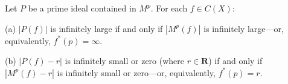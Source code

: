 Let $P$ be a prime ideal contained in $M^p$. For each $f \in C(X)$:

(a) $|P(f)|$ is infinitely large if and only if $|M^p(f)|$ is infinitely large---or, equivalently, $f^*(p) = \infty$.

(b) $|P(f) - r|$ is infinitely small or zero (where $r \in \mathbf{R}$) if and only if $|M^p(f) - r|$ is infinitely small or zero---or, equivalently, $f^*(p) = r$.
